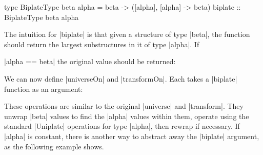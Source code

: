 \begin{comment}
\begin{code}
type BiplateType beta alpha = beta -> ([alpha], [alpha] -> beta)
\end{code}
\end{comment}

\begin{code}
type BiplateType beta alpha = beta -> ([alpha], [alpha] -> beta)
biplate :: BiplateType beta alpha
\end{code}

The intuition for |biplate| is that given a structure of type |beta|, the function should return the largest substructures in it of type |alpha|. If \ignore|alpha == beta| the original value should be returned:

\begin{code}
biplateSelf :: BiplateType alpha alpha
biplateSelf x = ([x], \[x'] -> x')
\end{code}

We can now define |universeOn| and |transformOn|. Each takes a |biplate| function as an argument:


These operations are similar to the original |universe| and |transform|. They unwrap |beta| values to find the |alpha| values within them, operate using the standard |Uniplate| operations for type |alpha|, then rewrap if necessary. If |alpha| is constant, there is another way to abstract away the |biplate| argument, as the following example shows.


